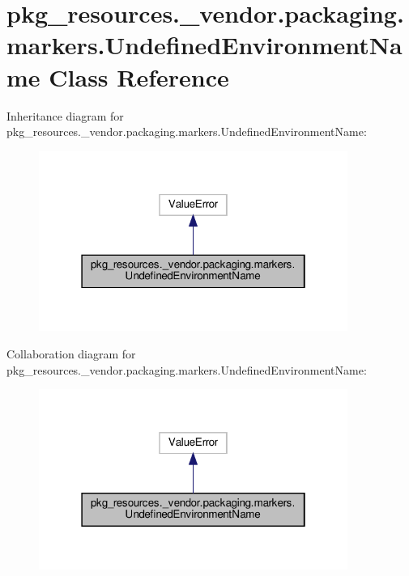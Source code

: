 \hypertarget{classpkg__resources_1_1__vendor_1_1packaging_1_1markers_1_1UndefinedEnvironmentName}{}\section{pkg\+\_\+resources.\+\_\+vendor.\+packaging.\+markers.\+Undefined\+Environment\+Name Class Reference}
\label{classpkg__resources_1_1__vendor_1_1packaging_1_1markers_1_1UndefinedEnvironmentName}


Inheritance diagram for pkg\+\_\+resources.\+\_\+vendor.\+packaging.\+markers.\+Undefined\+Environment\+Name\+:
\nopagebreak
\begin{figure}[H]
\begin{center}
\leavevmode
\includegraphics[width=286pt]{classpkg__resources_1_1__vendor_1_1packaging_1_1markers_1_1UndefinedEnvironmentName__inherit__graph}
\end{center}
\end{figure}


Collaboration diagram for pkg\+\_\+resources.\+\_\+vendor.\+packaging.\+markers.\+Undefined\+Environment\+Name\+:
\nopagebreak
\begin{figure}[H]
\begin{center}
\leavevmode
\includegraphics[width=286pt]{classpkg__resources_1_1__vendor_1_1packaging_1_1markers_1_1UndefinedEnvironmentName__coll__graph}
\end{center}
\end{figure}


